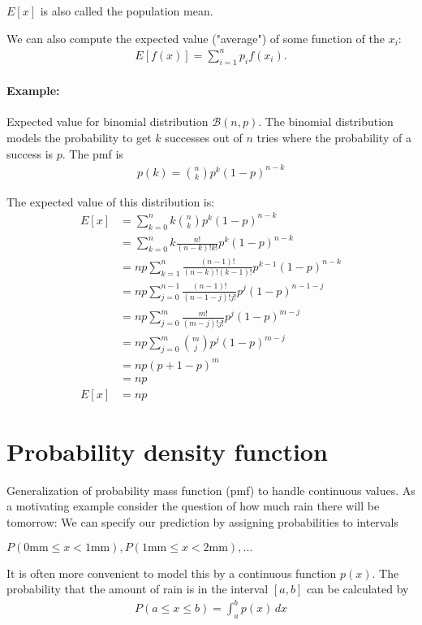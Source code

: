 $E[x]$ is also called the population mean.
   
We can also compute the expected value ("average") of some function of the $x_i$:
\begin{align}
  E[f(x)]  = \sum_{i=1}^{n}p_{i}f(x_{i}).
\end{align}

\paragraph{Example:} Expected value for binomial distribution $\mathcal{B}(n,p)$.
The binomial distribution models the probability to get $k$ successes out of $n$ tries where 
the probability of a success is $p$.
The pmf is
\begin{align}
  p(k) = {n\choose k}p^k(1-p)^{n-k}
\end{align}

The expected value of this distribution is:
\begin{align}
  E[x]&=\sum_{k=0}^{n}k {n\choose k}p^k (1-p)^{n-k}\\
      &=\sum_{k=0}^{n}k \frac{n!}{(n-k)!k!} p^k (1-p)^{n-k}\\
      &=np\sum_{k=1}^{n} \frac{(n-1)!}{(n-k)!(k-1)!} p^{k-1} (1-p)^{n-k} \\
      &=np\sum_{j=0}^{n-1} \frac{(n-1)!}{(n-1-j)!j!} p^j (1-p)^{n-1-j}\\
      &=np\sum_{j=0}^{m} \frac{m!}{(m-j)!j!} p^j (1-p)^{m-j} \\
      &=np\sum_{j=0}^{m} {m\choose j} p^j (1-p)^{m-j}\\
      &=np (p+1-p)^m\\
      &=np \\
  E[x]&=np
\end{align}

\section{Probability density function}
Generalization of probability mass function (pmf) to handle continuous values.
As a motivating example consider the question of how much rain there will be tomorrow:
We can specify our prediction by assigning probabilities to intervals
\begin{center}
    $P(0\text{mm} \leq x < 1\text{mm}), P(1\text{mm} \leq x < 2\text{mm}),\hdots$
\end{center}

It is often more convenient to model this by a continuous function $p(x)$.
The probability that the amount of rain is in the interval $[a,b]$ can be calculated by 
\begin{align}
P(a\leq x \leq b)=\int_{a}^{b} p(x) \,dx
\end{align}

